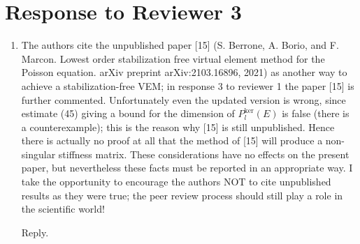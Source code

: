 \documentclass[10pt]{amsart}
\theoremstyle{definition}
\theoremstyle{remark}
\begin{document}
\section{Response to Reviewer 3}

\begin{enumerate}[1.]
\item \textsf{The authors cite the unpublished paper [15] (S. Berrone, A. Borio, and F. Marcon. Lowest order stabilization free virtual element method for the Poisson equation. arXiv preprint arXiv:2103.16896, 2021) as another way to achieve a stabilization-free VEM; in response 3 to reviewer 1 the paper [15] is further commented. Unfortunately even the updated version is wrong, since estimate (45) giving a bound for the dimension of $P_l^\text{ker}(E)$ is false (there is a counterexample); this is the reason why [15] is still unpublished. Hence there is actually no proof at all that the method of [15] will produce a non-singular stiffness matrix. These considerations have no effects on the present paper, but nevertheless these facts must be reported in an appropriate way. \vskip0.1cm
\noindent 
I take the opportunity to encourage the authors NOT to cite unpublished results as they were true; the peer review process should still play a role in the scientific world!}

\smallskip \noindent \textcolor[rgb]{1.00,0.00,0.00}{Reply.}




\end{enumerate}





\end{document}
